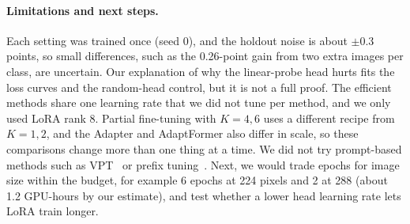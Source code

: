 \paragraph{Limitations and next steps.}
Each setting was trained once (seed 0), and the holdout noise is about $\pm$0.3 points, so small differences, such as the 0.26-point gain from two extra images per class, are uncertain.
Our explanation of why the linear-probe head hurts fits the loss curves and the random-head control, but it is not a full proof.
The efficient methods share one learning rate that we did not tune per method, and we only used LoRA rank 8.
Partial fine-tuning with $K = 4, 6$ uses a different recipe from $K = 1, 2$, and the Adapter and AdaptFormer also differ in scale, so these comparisons change more than one thing at a time.
We did not try prompt-based methods such as VPT~\cite{jia2022vpt} or prefix tuning~\cite{li2021prefix}.
Next, we would trade epochs for image size within the budget, for example 6 epochs at 224 pixels and 2 at 288 (about 1.2 GPU-hours by our estimate), and test whether a lower head learning rate lets LoRA train longer.
